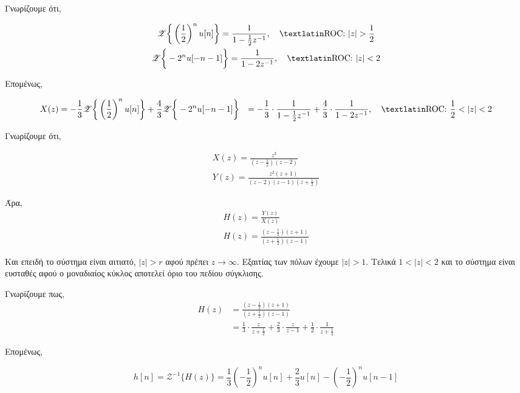 \documentclass{assignment}
\begin{document}
\begin{answers}

\answer 
Γνωρίζουμε ότι,

\begin{gather*} 
\mathscr{Z}\bigg\{\left(\frac{1}{2}\right)^{n}u[n]\bigg\} = \frac{1}{1-\frac{1}{2}z^{-1}}, \quad \text{\en{ROC: }}|z| > \frac{1}{2} \\
\mathscr{Z}\bigg\{-2^nu[-n-1]\bigg\} = \frac{1}{1-2z^{-1}}, \quad \text{\en{ROC: }}|z| < 2
\end{gather*}

Επομένως,

\begin{align*}
X(z) &= -\frac{1}{3}\mathscr{Z}\bigg\{\left(\frac{1}{2}\right)^nu[n]\bigg\} + \frac{4}{3}\mathscr{Z}\bigg\{-2^nu[-n-1]\bigg\}
     &= -\frac{1}{3}\cdot\frac{1}{1-\frac{1}{2}z^{-1}} + \frac{4}{3}\cdot\frac{1}{1-2z^{-1}}, \quad \text{\en{ROC: }} \frac{1}{2} < |z| < 2
\end{align*}

\answer
Γνωρίζουμε ότι,

\begin{gather*} 
X(z) = \frac{z^2}{\left(z-\frac{1}{2}\right)(z-2)} \\
Y(z) = \frac{z^2(z+1)}{(z-2)(z-1)\left(z+\frac{1}{2}\right)}
\end{gather*}

Άρα,
\begin{gather*}
H(z) = \frac{Y(z)}{X(z)} \\
H(z) = \frac{\left(z-\frac{1}{2}\right)(z+1)}{\left(z+\frac{1}{2}\right)(z-1)}
\end{gather*}

Και επειδή το σύστημα είναι αιτιατό, $|z| > r$ αφού πρέπει $z \to \infty$. Εξαιτίας των πόλων έχουμε $|z| > 1$.
Τελικά  $1 < |z| < 2$ και το σύστημα είναι ευσταθές αφού ο μοναδιαίος κύκλος αποτελεί όριο του πεδίου σύγκλισης.


\answer

Γνωρίζουμε πως,
\begin{align*}
H(z) &= \frac{\left(z - \frac{1}{2}\right)(z+1)}{\left(z+\frac{1}{2}\right)(z-1)} \\
     &= \frac{1}{3}\cdot\frac{z}{z+\frac{1}{2}}+\frac{2}{3}\cdot\frac{z}{z-1} + \frac{1}{2}\cdot\frac{1}{z+\frac{1}{2}}
\end{align*}


Επομένως,

\begin{equation*}
h[n] = \mathscr{Z}^{-1} \bigg\{ H(z)\bigg\} = \frac{1}{3}\left(-\frac{1}{2}\right)^n u[n] + \frac{2}{3}u[n] -\left(-\frac{1}{2}\right)^n u[n-1]
\end{equation*}



\end{answers}
\end{document}
